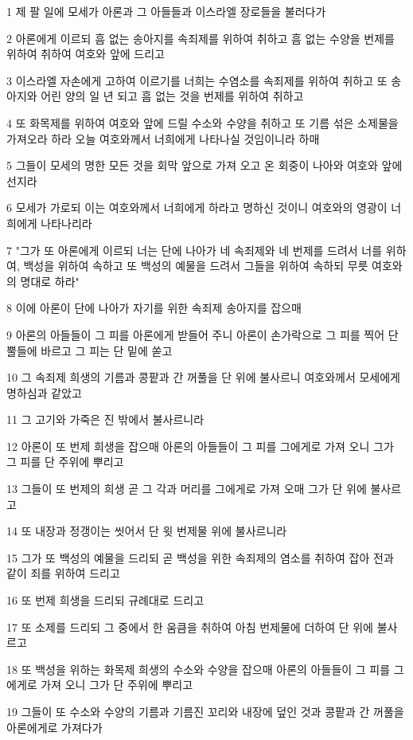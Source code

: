 \par 1 제 팔 일에 모세가 아론과 그 아들들과 이스라엘 장로들을 불러다가
\par 2 아론에게 이르되 흠 없는 송아지를 속죄제를 위하여 취하고 흠 없는 수양을 번제를 위하여 취하여 여호와 앞에 드리고
\par 3 이스라엘 자손에게 고하여 이르기를 너희는 수염소를 속죄제를 위하여 취하고 또 송아지와 어린 양의 일 년 되고 흠 없는 것을 번제를 위하여 취하고
\par 4 또 화목제를 위하여 여호와 앞에 드릴 수소와 수양을 취하고 또 기름 섞은 소제물을 가져오라 하라 오늘 여호와께서 너희에게 나타나실 것임이니라 하매
\par 5 그들이 모세의 명한 모든 것을 회막 앞으로 가져 오고 온 회중이 나아와 여호와 앞에 선지라
\par 6 모세가 가로되 이는 여호와께서 너희에게 하라고 명하신 것이니 여호와의 영광이 너희에게 나타나리라
\par 7 "그가 또 아론에게 이르되 너는 단에 나아가 네 속죄제와 네 번제를 드려서 너를 위하여, 백성을 위하여 속하고 또 백성의 예물을 드려서 그들을 위하여 속하되 무릇 여호와의 명대로 하라"
\par 8 이에 아론이 단에 나아가 자기를 위한 속죄제 송아지를 잡으매
\par 9 아론의 아들들이 그 피를 아론에게 받들어 주니 아론이 손가락으로 그 피를 찍어 단 뿔들에 바르고 그 피는 단 밑에 쏟고
\par 10 그 속죄제 희생의 기름과 콩팥과 간 꺼풀을 단 위에 불사르니 여호와께서 모세에게 명하심과 같았고
\par 11 그 고기와 가죽은 진 밖에서 불사르니라
\par 12 아론이 또 번제 희생을 잡으매 아론의 아들들이 그 피를 그에게로 가져 오니 그가 그 피를 단 주위에 뿌리고
\par 13 그들이 또 번제의 희생 곧 그 각과 머리를 그에게로 가져 오매 그가 단 위에 불사르고
\par 14 또 내장과 정갱이는 씻어서 단 윗 번제물 위에 불사르니라
\par 15 그가 또 백성의 예물을 드리되 곧 백성을 위한 속죄제의 염소를 취하여 잡아 전과 같이 죄를 위하여 드리고
\par 16 또 번제 희생을 드리되 규례대로 드리고
\par 17 또 소제를 드리되 그 중에서 한 움큼을 취하여 아침 번제물에 더하여 단 위에 불사르고
\par 18 또 백성을 위하는 화목제 희생의 수소와 수양을 잡으매 아론의 아들들이 그 피를 그에게로 가져 오니 그가 단 주위에 뿌리고
\par 19 그들이 또 수소와 수양의 기름과 기름진 꼬리와 내장에 덮인 것과 콩팥과 간 꺼풀을 아론에게로 가져다가
